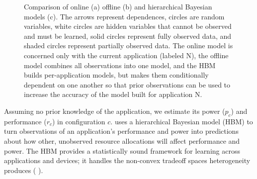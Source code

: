 {\begin{figure}
  \caption{ Comparison of online (a) offline (b) and hierarchical
    Bayesian models (c).  The arrows represent dependences, circles
    are random variables, white circles are hidden variables that
    cannot be observed and must be learned, solid circles represent
    fully observed data, and shaded circles represent partially
    observed data.  The online model is concerned only with the
    current application (labeled N), the offline model combines all
    observations into one model, and the HBM builds per-application
    models, but makes them conditionally dependent on one another so
    that prior observations can be used to increase the accuracy of
    the model built for application N.}
\label{fig:learning-models}
\end{figure}
}

Assuming no prior knowledge of the application, we estimate its power
($p_c$) and performance ($r_c$) in configuration $c$.
  \SYSTEM{} uses a hierarchical Bayesian model (HBM) to
turn observations of an application's performance and power into
predictions about how other, unobserved resource allocations will
affect performance and power.  The HBM provides a statistically sound
framework for learning across applications and devices; \ie{} it
handles the non-convex tradeoff spaces heterogeneity produces (\eg{}
).

